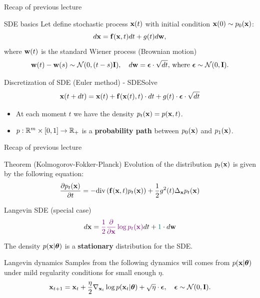 \begin{frame}{Recap of previous lecture}
	\vspace{-0.2cm}
	\begin{block}{SDE basics}
		Let define stochastic process $\mathbf{x}(t)$ with initial condition $\mathbf{x}(0) \sim p_0(\mathbf{x})$:
		\[
			d\mathbf{x} = \mathbf{f}(\mathbf{x}, t) dt + g(t) d \mathbf{w}, 
		\]
		where $\mathbf{w}(t)$ is the standard Wiener process (Brownian motion)
		\vspace{-0.2cm}
		\[		
			\mathbf{w}(t) - \mathbf{w}(s) \sim \mathcal{N}(0, (t - s) \mathbf{I}), \quad d \mathbf{w} = \boldsymbol{\epsilon} \cdot \sqrt{dt}, \, \text{where } \boldsymbol{\epsilon} \sim \mathcal{N}(0, \mathbf{I}).
		\]
	\end{block}
	\vspace{-0.3cm}
	\begin{block}{Discretization of SDE (Euler method) - SDESolve}
		\vspace{-0.3cm}
		\[
			\mathbf{x}(t + dt) = \mathbf{x}(t) + \mathbf{f}(\mathbf{x}(t), t) \cdot dt + g(t) \cdot \boldsymbol{\epsilon} \cdot \sqrt{dt}
		\]
		\vspace{-0.3cm}
	\end{block}
	\begin{itemize}
		\item At each moment $t$ we have the density $p_t(\mathbf{x}) = p(\mathbf{x}, t)$.
		\item $p: \mathbb{R}^m \times [0, 1] \rightarrow \mathbb{R}_+$ is a \textbf{probability path} between $p_0(\mathbf{x})$ and $p_1(\mathbf{x})$.
	\end{itemize}
\end{frame}
\begin{frame}{Recap of previous lecture}
 	\begin{block}{Theorem (Kolmogorov-Fokker-Planck)}
 		Evolution of the distribution $p_t(\mathbf{x})$ is given by the following equation:
 		\vspace{-0.3cm}
 		\[
 			\frac{\partial p_t(\mathbf{x})}{\partial t} = - \text{div}\left(\mathbf{f}(\mathbf{x}, t) p_t(\mathbf{x})\right) + \frac{1}{2}g^2(t) \Delta_{\mathbf{x}}p_t(\mathbf{x})
 		\]
 		\vspace{-0.5cm}
 	\end{block}
 	\begin{block}{Langevin SDE (special case)}
 		\vspace{-0.3cm}
 		\[
 			d \mathbf{x} = {\color{violet}\frac{1}{2} \frac{\partial}{\partial \mathbf{x}} \log p_t(\mathbf{x})} d t + {\color{teal} 1 } \cdot d \mathbf{w}
 		\]
 		\vspace{-0.3cm}
 	\end{block}
 	The density $p(\mathbf{x} | \boldsymbol{\theta})$ is a \textbf{stationary} distribution for the SDE.
	\begin{block}{Langevin dynamics}
		Samples from the following dynamics will comes from $p(\mathbf{x} | \boldsymbol{\theta})$ under mild regularity conditions for small enough $\eta$.
		\vspace{-0.2cm}
		\[
			\mathbf{x}_{t + 1} = \mathbf{x}_t + \frac{\eta}{2} \nabla_{\mathbf{x}_t} \log p(\mathbf{x}_t | \boldsymbol{\theta}) + \sqrt{\eta} \cdot \boldsymbol{\epsilon}, \quad \boldsymbol{\epsilon} \sim \mathcal{N}(0, \mathbf{I}).
		\]
	\end{block}
\end{frame}
